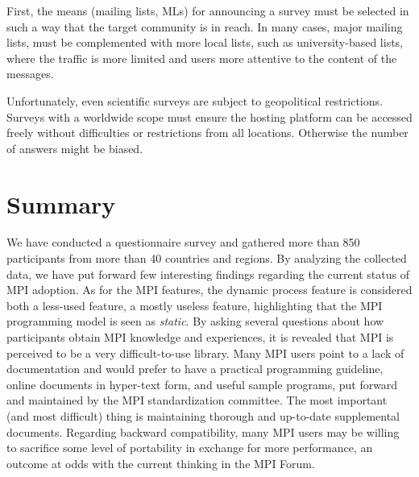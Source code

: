 \documentclass[preprint,5p,times]{elsarticle}
\begin{document}
{{\begin{description}[leftmargin=0cm]
\item[Reaching Target Community]
First, the means (mailing lists, MLs) for announcing a survey
must be selected in such a way that the target community is in reach.
In many cases, major mailing lists, must be complemented with more local lists,
such as university-based lists, where the traffic is more limited and
users more attentive to the content of the messages.

%

\item[Online Forms]
Unfortunately, even scientific surveys are subject to geopolitical restrictions.
Surveys with a worldwide scope must ensure the hosting platform
can be accessed freely
without difficulties or restrictions from all locations. Otherwise the number of
answers might be biased.

\end{description}
}

\section{Summary}

We have conducted a questionnaire survey and gathered more than 850
participants from more than 40 countries and regions. By analyzing the collected
data, we have put forward few interesting findings regarding the current status
of MPI adoption. As for the MPI features, the dynamic process feature is
considered both a less-used feature, a mostly useless feature,
highlighting that the MPI programming model is seen as {\em static}. By asking
several questions about how participants obtain MPI knowledge and experiences, it is
revealed that MPI is perceived to be a very difficult-to-use library.
 Many MPI users point to a lack of
documentation and would prefer to have a practical programming guideline, online
documents in hyper-text form, and useful sample programs, put forward and
maintained by the MPI standardization committee. The most important (and most
difficult) thing is maintaining thorough and up-to-date supplemental documents.
Regarding backward compatibility, many MPI users may be willing to
sacrifice some level of portability in exchange for more performance, an outcome
at odds with the current thinking in the MPI Forum.

}
\end{document}
